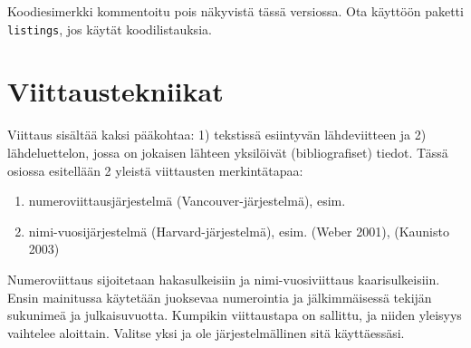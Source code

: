\documentclass[globalnumbering,centeredcaptions,draftfooter]{tutthesis/tutthesis} %
\newif\ifnameyear
\begin{document}
\iffalse %
\begin{lstlisting}[float,caption={Esimerkki ohjelmakoodin esittämisestä kuvan tapaan.},label={lst:jarjesta},language=C]
void jarjesta( Kirjainpari taulukko[], int koko )
{
  // Jarjestetaan taulukko siten, etta jokaisella kierroksella
  // valitaan alkio, joka kuuluu taulukon ensimmaiseksi ja siirretaan
  // se oikealle paikalleen.
  for( int i = 0; i < koko; ++i )
  {
    // Etsitaan pienin eli lahinna aakkosten alkua oleva
    // kirjan lopputaulukosta
    int pienimmanKohta = i;
    for( int j = i; j < koko; ++j )
    {
      if( taulukko[ j ].korvattava
          < taulukko[ pienimmanKohta ].korvattava )
      {
        pienimmanKohta = j;
      }
    }
    // Vaihdetaan pienin alkio omalle paikalleen
    Kirjainpari tmp            = taulukko[ i ];
    taulukko[ i ]              = taulukko[ pienimmanKohta ];
    taulukko[ pienimmanKohta ] = tmp;
  }
  return;
}
\end{lstlisting}
\else
\label{lst:jarjesta}
Koodiesimerkki kommentoitu pois näkyvistä tässä versiossa. Ota käyttöön paketti \texttt{listings}, jos käytät koodilistauksia.
\fi


\chapter{Viittaustekniikat}
\label{ch:viittaustekniikat}

Viittaus sisältää kaksi pääkohtaa: 1) tekstissä esiintyvän lähdeviitteen ja 2) lähdeluettelon, jossa on jokaisen lähteen yksilöivät (bibliografiset) tiedot.
Tässä osiossa esitellään 2 yleistä viittausten merkintätapaa:
\begin{enumerate}
\ifnameyear
  \item numeroviittausjärjestelmä (Vancouver-järjestelmä), esim. [1], [2]\ldots
  \item nimi-vuosijärjestelmä (Harvard-järjestelmä), esim. \citep{Weber2001}, \citep{Kaunisto2003}
\else
  \item numeroviittausjärjestelmä (Vancouver-järjestelmä), esim. \cite{Weber2001}\cite{Kaunisto2003}
  \item nimi-vuosijärjestelmä (Harvard-järjestelmä), esim. (Weber 2001), (Kaunisto 2003)
\fi
\end{enumerate}

Numeroviittaus sijoitetaan hakasulkeisiin ja nimi-vuosiviittaus kaarisulkeisiin.
Ensin mainitussa käytetään juoksevaa numerointia ja jälkimmäisessä tekijän sukunimeä ja julkaisuvuotta.
Kumpikin viittaustapa on sallittu, ja niiden yleisyys vaihtelee aloittain.
Valitse yksi ja ole järjestelmällinen sitä käyttäessäsi.
\end{document}
